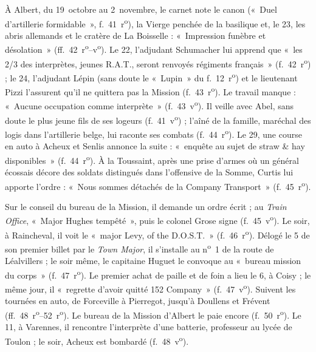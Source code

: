 À Albert, du 19~octobre au 2~novembre, le carnet note le canon («~Duel d'artillerie formidable~», f.~41~r\textsuperscript{o}), la Vierge penchée de la basilique et, le 23, les abris allemands et le cratère de La Boisselle : «~Impression funèbre et désolation~» (ff.~42~r\textsuperscript{o}--v\textsuperscript{o}). Le 22, l'adjudant Schumacher lui apprend que «~les 2/3 des interprètes, jeunes R.A.T., seront renvoyés régiments français~» (f.~42~r\textsuperscript{o}) ; le 24, l'adjudant Lépin (sans doute le «~Lupin~» du f.~12~r\textsuperscript{o}) et le lieutenant Pizzi l'assurent qu'il ne quittera pas la Mission (f.~43~r\textsuperscript{o}). Le travail manque : «~Aucune occupation comme interprète~» (f.~43~v\textsuperscript{o}). Il veille avec Abel, sans doute le plus jeune fils de ses logeurs (f.~41~v\textsuperscript{o}) ; l'aîné de la famille, maréchal des logis dans l'artillerie belge, lui raconte ses combats (f.~44~r\textsuperscript{o}). Le 29, une course en auto à Acheux et Senlis annonce la suite : «~enquête au sujet de straw \& hay disponibles~» (f.~44~r\textsuperscript{o}). À la Toussaint, après une prise d'armes où un général écossais décore des soldats distingués dans l'offensive de la Somme, Curtis lui apporte l'ordre : «~Nous sommes détachés de la Company Transport~» (f.~45~r\textsuperscript{o}).

Sur le conseil du bureau de la Mission, il demande un ordre écrit ; au \textit{Train Office}, «~Major Hughes tempêté~», puis le colonel Grose signe (f.~45~v\textsuperscript{o}). Le soir, à Raincheval, il voit le «~major Levy, of the D.O.S.T.~» (f.~46~r\textsuperscript{o}). Délogé le 5 de son premier billet par le \textit{Town Major}, il s'installe au n\textsuperscript{o}~1 de la route de Léalvillers ; le soir même, le capitaine Huguet le convoque au «~bureau mission du corps~» (f.~47~r\textsuperscript{o}). Le premier achat de paille et de foin a lieu le 6, à Coisy ; le même jour, il «~regrette d'avoir quitté 152 Company~» (f.~47~v\textsuperscript{o}). Suivent les tournées en auto, de Forceville à Pierregot, jusqu'à Doullens et Frévent (ff.~48~r\textsuperscript{o}--52~r\textsuperscript{o}). Le bureau de la Mission d'Albert le paie encore (f.~50~r\textsuperscript{o}). Le 11, à Varennes, il rencontre l'interprète d'une batterie, professeur au lycée de Toulon ; le soir, Acheux est bombardé (f.~48~v\textsuperscript{o}).

